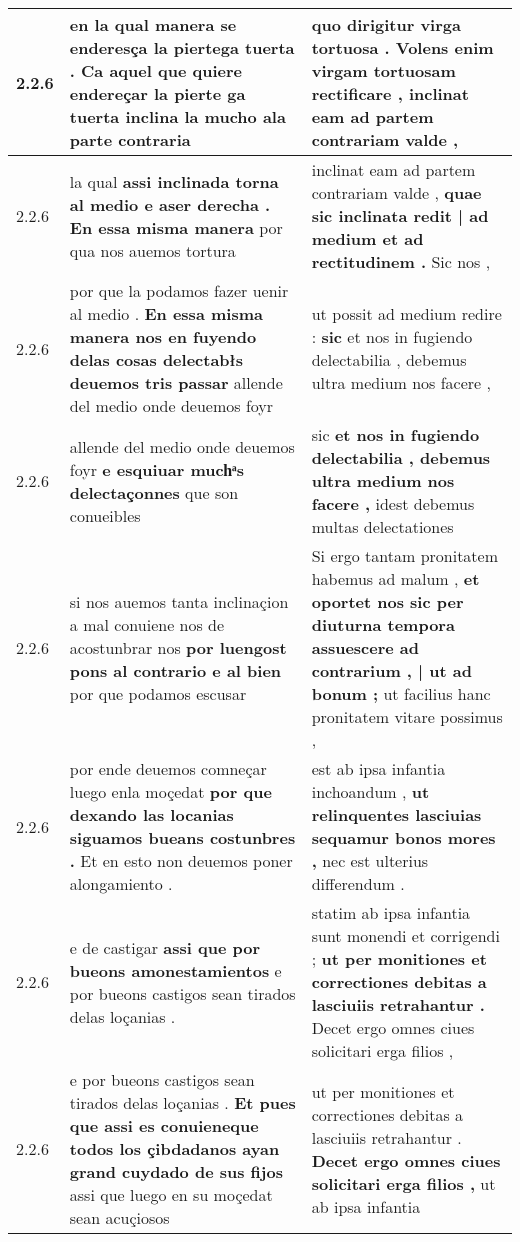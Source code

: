 \begin{tabular}{|p{1cm}|p{6.5cm}|p{6.5cm}|}
2.2.6 & en la qual manera se enderesça la piertega tuerta . \textbf{ Ca aquel que quiere endereçar la pierte ga tuerta } inclina la mucho ala parte contraria & quo dirigitur virga tortuosa . \textbf{ Volens enim virgam tortuosam rectificare , } inclinat eam ad partem contrariam valde , \\\hline
2.2.6 & la qual \textbf{ assi inclinada torna al medio e aser derecha . En essa misma manera } por qua nos auemos tortura & inclinat eam ad partem contrariam valde , \textbf{ quae sic inclinata redit | ad medium et ad rectitudinem . } Sic nos , \\\hline
2.2.6 & por que la podamos fazer uenir al medio . \textbf{ En essa misma manera nos en fuyendo delas cosas delectabłs deuemos tris passar } allende del medio onde deuemos foyr & ut possit ad medium redire : \textbf{ sic } et nos in fugiendo delectabilia , debemus ultra medium nos facere , \\\hline
2.2.6 & allende del medio onde deuemos foyr \textbf{ e esquiuar muchͣs delectaçonnes } que son conueibles & sic \textbf{ et nos in fugiendo delectabilia , debemus ultra medium nos facere , } idest debemus multas delectationes \\\hline
2.2.6 & si nos auemos tanta inclinaçion a mal conuiene nos de acostunbrar nos \textbf{ por luengost pons al contrario e al bien } por que podamos escusar & Si ergo tantam pronitatem habemus ad malum , \textbf{ et oportet nos sic per diuturna tempora assuescere ad contrarium , | ut ad bonum ; } ut facilius hanc pronitatem vitare possimus , \\\hline
2.2.6 & por ende deuemos comneçar luego enla moçedat \textbf{ por que dexando las locanias siguamos bueans costunbres . } Et en esto non deuemos poner alongamiento . & est ab ipsa infantia inchoandum , \textbf{ ut relinquentes lasciuias sequamur bonos mores , } nec est ulterius differendum . \\\hline
2.2.6 & e de castigar \textbf{ assi que por bueons amonestamientos } e por bueons castigos sean tirados delas loçanias . & statim ab ipsa infantia sunt monendi et corrigendi ; \textbf{ ut per monitiones et correctiones debitas a lasciuiis retrahantur . } Decet ergo omnes ciues solicitari erga filios , \\\hline
2.2.6 & e por bueons castigos sean tirados delas loçanias . \textbf{ Et pues que assi es conuieneque todos los çibdadanos ayan grand cuydado de sus fijos } assi que luego en su moçedat sean acuçiosos & ut per monitiones et correctiones debitas a lasciuiis retrahantur . \textbf{ Decet ergo omnes ciues solicitari erga filios , } ut ab ipsa infantia \\\hline

\end{tabular}

